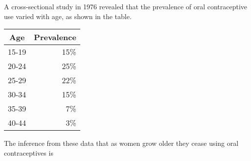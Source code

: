 
A cross-sectional study in 1976 revealed that the prevalence of oral
contraceptive use varied with age, as shown in the table.

\begin{center}
\begin{tabular}{cr}
Age & Prevalence\\\hline
15-19 & 15\%\\
20-24 & 25\%\\
25-29 & 22\%\\
30-34 & 15\%\\
35-39 & 7\%\\
40-44 & 3\%\\
\end{tabular}
\end{center}

The inference from these data that as women grow older they cease
using oral contraceptives is
\begin{MultipleChoice}
\end{MultipleChoice}


